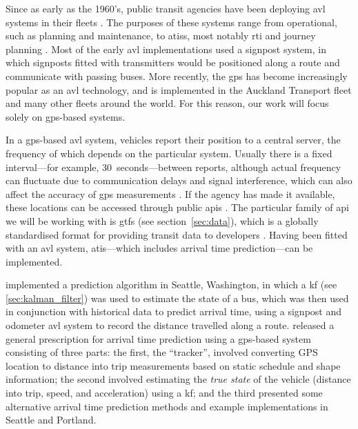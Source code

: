 \documentclass[12pt,a4paper]{article}
\begin{document}




Since as early as the 1960's, public transit agencies have been deploying \gls{avl} systems
in their fleets \citep{tcrp:1997}.
The purposes of these systems range from operational, such as planning and maintenance, 
to \glspl{atis}, most notably \gls{rti} and journey planning \citep{tcrp:2003}.
Most of the early \gls{avl} implementations used a signpost system,
in which signposts fitted with transmitters would be positioned along a route
and communicate with passing buses.
More recently, the \gls{gps} has become increasingly popular as an \gls{avl} technology,
and is implemented in the Auckland Transport fleet
and many other fleets around the world.
For this reason, our work will focus solely on \gls{gps}-based systems.


In a \gls{gps}-based \gls{avl} system, vehicles report their position to a central server,
the frequency of which depends on the particular system.
Usually there is a fixed interval---for example, 30~seconds---between reports,
although actual frequency can fluctuate due to communication delays and signal interference,
which can also affect the accuracy of \gls{gps} measurements \citep{cn}.
If the agency has made it available, 
these locations can be accessed through public \glspl{api}
\citep{tcrp:2003}.
The particular family of \gls{api} we will be working with is \gls{gtfs}
(see section~\ref{sec:data}),
which is a globally standardised format for providing transit data to developers
\citep{gtfs}.
Having been fitted with an \gls{avl} system, 
\gls{atis}---which includes arrival time prediction---can be implemented.


\cite{dailey:2001} implemented a prediction algorithm in Seattle, Washington,
in which a \gls{kf} (see \cref{sec:kalman_filter}) was used to estimate the state of a bus, 
which was then used in conjunction with historical data to predict arrival time,
using a signpost and odometer \gls{avl} system to record the distance travelled along a route.
\cite{cathey-dailey:2003} released a general prescription for arrival time prediction using
a \gls{gps}-based system consisting of three parts:
the first, the ``tracker'', involved converting GPS location to distance into trip measurements
based on static schedule and shape information;
the second involved estimating the \emph{true state} of the vehicle (distance into trip, speed, 
and acceleration) using a \gls{kf};
and the third presented some alternative arrival time prediction methods and example implementations
in Seattle and Portland.
\end{document}
